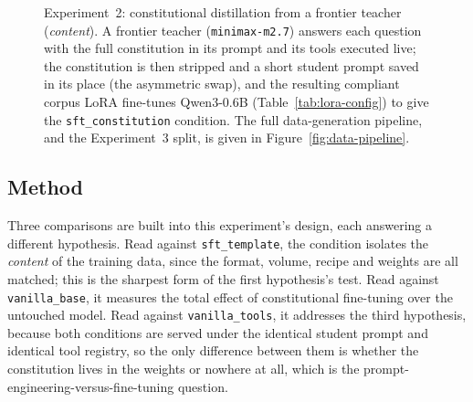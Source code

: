\begin{figure}[t]
  \centering
  \caption{Experiment~2: constitutional distillation from a frontier teacher (\emph{content}). A frontier teacher (\texttt{minimax-m2.7}) answers each question with the full constitution in its prompt and its tools executed live; the constitution is then stripped and a short student prompt saved in its place (the asymmetric swap), and the resulting compliant corpus LoRA fine-tunes Qwen3-0.6B (Table~\ref{tab:lora-config}) to give the \texttt{sft\_constitution} condition. The full data-generation pipeline, and the Experiment~3 split, is given in Figure~\ref{fig:data-pipeline}.}
  \label{fig:exp2-pipeline}
\end{figure}

\subsection{Method}
\label{subsec:mr-exp2-method}

Three comparisons are built into this experiment's design, each answering a different hypothesis. Read against \texttt{sft\_template}, the condition isolates the \emph{content} of the training data, since the format, volume, recipe and weights are all matched; this is the sharpest form of the first hypothesis's test. Read against \texttt{vanilla\_base}, it measures the total effect of constitutional fine-tuning over the untouched model. Read against \texttt{vanilla\_tools}, it addresses the third hypothesis, because both conditions are served under the identical student prompt and identical tool registry, so the only difference between them is whether the constitution lives in the weights or nowhere at all, which is the prompt-engineering-versus-fine-tuning question.

